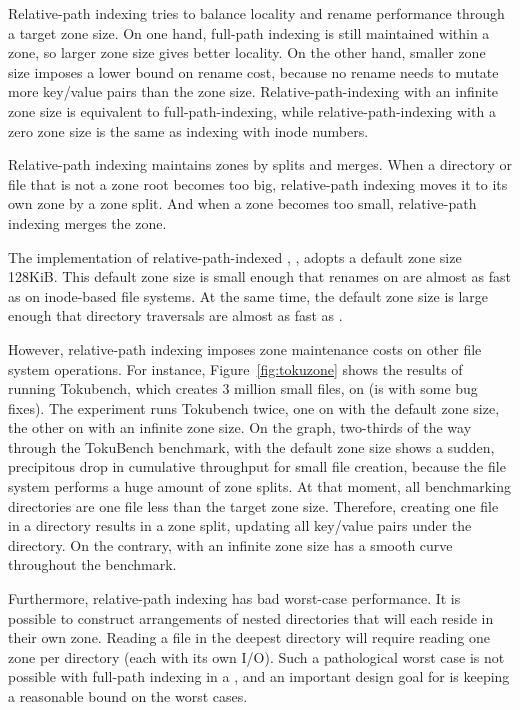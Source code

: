 Relative-path indexing tries to balance locality and rename performance through
a target zone size.
On one hand, full-path indexing is still maintained within a zone,
so larger zone size gives better locality.
On the other hand, smaller zone size imposes a lower bound on rename cost,
because no rename needs to mutate more key/value pairs than the zone size.
Relative-path-indexing with an infinite zone size is equivalent to
full-path-indexing, while relative-path-indexing with a zero zone size is the
same as indexing with inode numbers.

Relative-path indexing maintains zones by splits and merges.
When a directory or file that is not a zone root becomes too big,
relative-path indexing moves it to its own zone by a zone split.
And when a zone becomes too small, relative-path indexing merges the zone.

The implementation of relative-path-indexed \betrfs, \betrfsTwo, adopts a
default zone size 128KiB.
This default zone size is small enough that renames on \betrfsTwo are almost
as fast as on inode-based file systems.
At the same time, the default zone size is large enough that directory
traversals are almost as fast as \betrfsOne.

However, relative-path indexing imposes zone maintenance costs on other file
system operations.
For instance, Figure~\ref{fig:tokuzone} shows the results of running Tokubench,
which creates 3 million small files, on \betrfsThree
(\betrfsThree is \betrfsTwo with some bug fixes).
The experiment runs Tokubench twice,
one on \betrfsThree with the default zone size,
the other on \betrfsThree with an infinite zone size.
On the graph, two-thirds of the way through the TokuBench benchmark,
\betrfsThree with the default zone size shows a sudden,
precipitous drop in cumulative throughput for small file creation,
because the file system performs a huge amount of zone splits.
At that moment, all benchmarking directories are one file less than the target
zone size.
Therefore, creating one file in a directory results in a zone split,
updating all key/value pairs under the directory.
On the contrary, \betrfsThree with an infinite zone size
has a smooth curve throughout the benchmark.

Furthermore, relative-path indexing has bad worst-case performance.
It is possible to construct arrangements of nested directories that will each
reside in their own zone.
Reading a file in the deepest directory will require reading one zone per
directory (each with its own I/O).
Such a pathological worst case is not possible with full-path indexing in a
\bet, and an important design goal for \betrfs is keeping a reasonable bound on
the worst cases.

